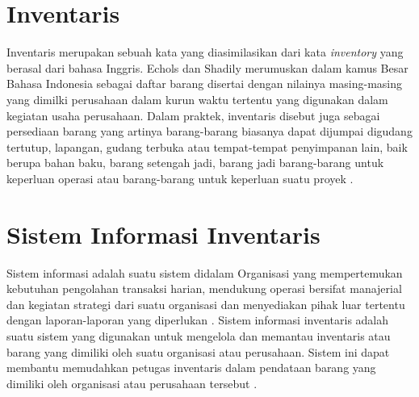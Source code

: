 
\section{Inventaris}
Inventaris merupakan sebuah kata yang diasimilasikan dari kata \textit{inventory} yang berasal dari bahasa Inggris. Echols dan Shadily merumuskan dalam kamus Besar Bahasa Indonesia sebagai daftar barang disertai dengan nilainya masing-masing yang dimilki perusahaan dalam kurun waktu tertentu yang digunakan dalam kegiatan usaha perusahaan. Dalam praktek, inventaris disebut juga sebagai persediaan barang yang artinya barang-barang biasanya dapat dijumpai digudang tertutup, lapangan, gudang terbuka atau tempat-tempat penyimpanan lain, baik berupa bahan baku, barang setengah jadi, barang jadi barang-barang untuk keperluan operasi atau barang-barang untuk keperluan suatu proyek \cite{novendri2019aplikasi}.
\section{Sistem Informasi Inventaris}
Sistem informasi adalah suatu sistem didalam Organisasi yang mempertemukan kebutuhan pengolahan transaksi harian, mendukung operasi bersifat manajerial dan kegiatan strategi dari suatu organisasi dan menyediakan pihak luar tertentu dengan laporan-laporan yang diperlukan \cite{laila2011sistem}. Sistem informasi inventaris adalah suatu sistem yang digunakan untuk mengelola dan memantau inventaris atau barang yang dimiliki oleh suatu organisasi atau perusahaan. Sistem ini dapat membantu memudahkan petugas inventaris dalam pendataan barang yang dimiliki oleh organisasi atau perusahaan tersebut \cite{Yanti2021SISTEMII}.
